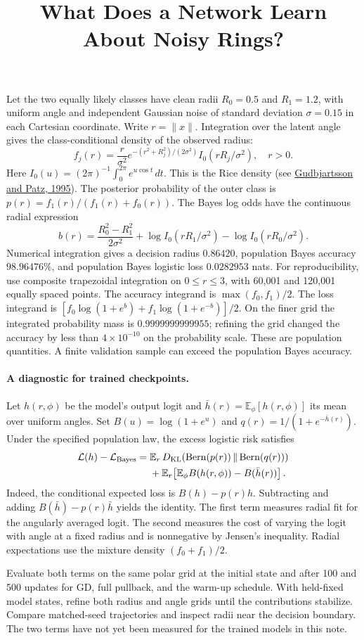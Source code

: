 \documentclass[11pt]{article}
\title{What Does a Network Learn About Noisy Rings?}
\author{}
\date{}
\begin{document}
\maketitle

Let the two equally likely classes have clean radii \(R_0=0.5\) and \(R_1=1.2\),
with uniform angle and independent Gaussian noise of standard deviation
\(\sigma=0.15\) in each Cartesian coordinate. Write \(r=\|x\|\).
Integration over the latent angle gives the class-conditional density of the observed radius:
\[
f_j(r)=\frac{r}{\sigma^2}e^{-(r^2+R_j^2)/(2\sigma^2)}
I_0(rR_j/\sigma^2),\quad r>0.
\]
Here \(I_0(u)=(2\pi)^{-1}\int_0^{2\pi} e^{u\cos t}\,dt\).
This is the Rice density (see
\href{https://pmc.ncbi.nlm.nih.gov/articles/PMC2254141/}{Gudbjartsson and Patz, 1995}).
The posterior probability of the outer class is \(p(r)=f_1(r)/(f_1(r)+f_0(r))\).
The Bayes log odds have the continuous radial expression
\[
b(r)=\frac{R_0^2-R_1^2}{2\sigma^2}
 +\log I_0(rR_1/\sigma^2)-\log I_0(rR_0/\sigma^2).
\]
Numerical integration gives a decision radius \(0.86420\), population Bayes
accuracy \(98.96476\%\), and population Bayes logistic loss \(0.0282953\) nats.
For reproducibility, use composite trapezoidal integration on \(0\le r\le3\),
with 60,001 and 120,001 equally spaced points. The accuracy integrand is
\(\max(f_0,f_1)/2\). The loss integrand is
\([f_0\log(1+e^{b})+f_1\log(1+e^{-b})]/2\).
On the finer grid the integrated probability mass is \(0.9999999999955\);
refining the grid changed the accuracy by less than \(4\times10^{-10}\) on
the probability scale. These are population quantities. A finite validation
sample can exceed the population Bayes accuracy.

\paragraph{A diagnostic for trained checkpoints.}
Let \(h(r,\phi)\) be the model's output logit and
\(\bar h(r)=\mathbb E_\phi[h(r,\phi)]\) its mean over uniform angles.
Set \(B(u)=\log(1+e^u)\) and \(q(r)=1/(1+e^{-\bar h(r)})\).
Under the specified population law, the excess logistic risk satisfies
\begin{align*}
\mathcal L(h)-\mathcal L_{\rm Bayes}
={}&\mathbb E_r\,D_{\rm KL}\!\left(\mathrm{Bern}(p(r))\,\|\,\mathrm{Bern}(q(r))\right)\\
&+\mathbb E_r\!\left[\mathbb E_\phi B(h(r,\phi))-B(\bar h(r))\right].
\end{align*}
Indeed, the conditional expected loss is \(B(h)-p(r)h\). Subtracting and
adding \(B(\bar h)-p(r)\bar h\) yields the identity. The first term measures
radial fit for the angularly averaged logit. The second measures the cost of
varying the logit with angle at a fixed radius and is nonnegative by Jensen's
inequality. Radial expectations use the mixture density \((f_0+f_1)/2\).

Evaluate both terms on the same polar grid at the initial state and after
100 and 500 updates for GD, full pullback, and the warm-up schedule. With
held-fixed model states, refine both radius and angle grids until the
contributions stabilize. Compare matched-seed trajectories and inspect radii
near the decision boundary. The two terms have not yet been measured for
the trained models in this note.
\end{document}
